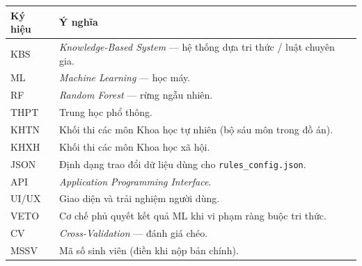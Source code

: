 \begin{table}[htbp]
\centering
\begin{tabular}{p{2.5cm}p{11cm}}
\toprule
\textbf{Ký hiệu} & \textbf{Ý nghĩa} \\
\midrule
KBS & \textit{Knowledge-Based System} --- hệ thống dựa tri thức / luật chuyên gia. \\
ML & \textit{Machine Learning} --- học máy. \\
RF & \textit{Random Forest} --- rừng ngẫu nhiên. \\
THPT & Trung học phổ thông. \\
KHTN & Khối thi các môn Khoa học tự nhiên (bộ sáu môn trong đồ án). \\
KHXH & Khối thi các môn Khoa học xã hội. \\
JSON & Định dạng trao đổi dữ liệu dùng cho \texttt{rules\_config.json}. \\
API & \textit{Application Programming Interface}. \\
UI/UX & Giao diện và trải nghiệm người dùng. \\
VETO & Cơ chế phủ quyết kết quả ML khi vi phạm ràng buộc tri thức. \\
CV & \textit{Cross-Validation} --- đánh giá chéo. \\
MSSV & Mã số sinh viên (điền khi nộp bản chính). \\
\bottomrule
\end{tabular}
\end{table}
